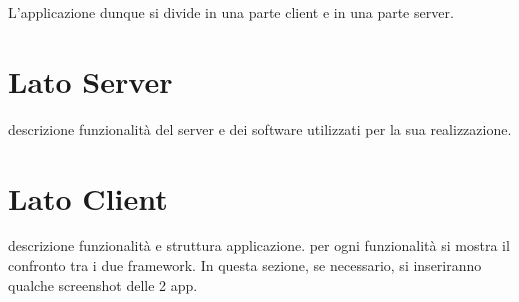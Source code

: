 	L'applicazione dunque si divide in una parte client e in una parte server.
	
	\section{Lato Server}
		descrizione funzionalità del server e dei software utilizzati per la sua
		realizzazione.
	
	\section{Lato Client}
		descrizione funzionalità e struttura applicazione. per ogni funzionalità
		si mostra il confronto tra i due framework. In questa sezione, se 
		necessario, si inseriranno qualche screenshot delle 2 app.
